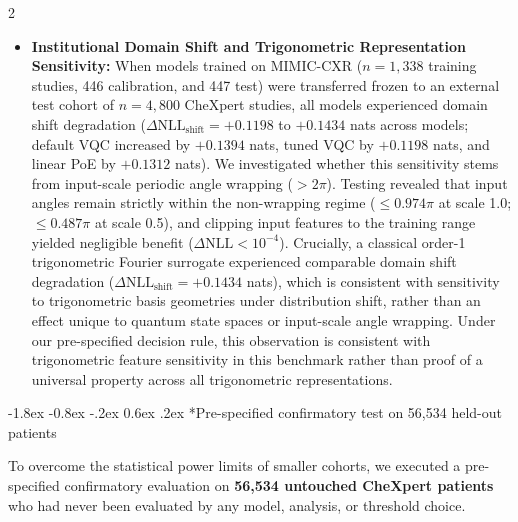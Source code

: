 \documentclass[10pt,a4paper,twoside]{article}
\makeatletter
\renewcommand{\subsection}{\@startsection{subsection}{2}{\z@}%
  {-1.8ex \@plus -0.8ex \@minus -.2ex}%
  {0.6ex \@plus.2ex}%
  {\normalfont\normalsize\sffamily\bfseries\color{naturedark}}}
\makeatother
\begin{document}
\begin{multicols}{2}
\begin{itemize}
  \item \textbf{Institutional Domain Shift and Trigonometric Representation Sensitivity:} When models trained on MIMIC-CXR ($n = 1,338$ training studies, 446 calibration, and 447 test) were transferred frozen to an external test cohort of $n = 4,800$ CheXpert studies, all models experienced domain shift degradation ($\Delta\text{NLL}_{\text{shift}} = +0.1198$ to $+0.1434$ nats across models; default VQC increased by $+0.1394$ nats, tuned VQC by $+0.1198$ nats, and linear PoE by $+0.1312$ nats). We investigated whether this sensitivity stems from input-scale periodic angle wrapping ($>2\pi$). Testing revealed that input angles remain strictly within the non-wrapping regime ($\le 0.974\pi$ at scale 1.0; $\le 0.487\pi$ at scale 0.5), and clipping input features to the training range yielded negligible benefit ($\Delta\text{NLL} < 10^{-4}$). Crucially, a classical order-1 trigonometric Fourier surrogate experienced comparable domain shift degradation ($\Delta\text{NLL}_{\text{shift}} = +0.1434$ nats), which is consistent with sensitivity to trigonometric basis geometries under distribution shift, rather than an effect unique to quantum state spaces or input-scale angle wrapping. Under our pre-specified decision rule, this observation is consistent with trigonometric feature sensitivity in this benchmark rather than proof of a universal property across all trigonometric representations.
\end{itemize}

\subsection*{Pre-specified confirmatory test on 56,534 held-out patients}

To overcome the statistical power limits of smaller cohorts, we executed a pre-specified confirmatory evaluation on \textbf{56,534 untouched CheXpert patients} who had never been evaluated by any model, analysis, or threshold choice.


\end{multicols}
\end{document}
